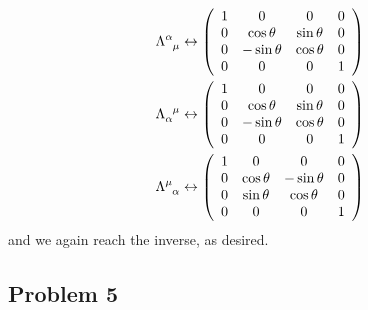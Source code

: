 \documentclass{mathnotes}
\begin{document}
\begin{align*}
    \tensor{\Lambda}{^\alpha_\mu}\leftrightarrow\left(\begin{array}{cccc}
        1 & 0 & 0 & 0\\
        0 & \cos\theta & \sin\theta & 0\\
        0 & -\sin\theta & \cos\theta & 0\\
        0 & 0 & 0 & 1
    \end{array}\right)\\
    \tensor{\Lambda}{_\alpha^\mu}\leftrightarrow\left(\begin{array}{cccc}
        1 & 0 & 0 & 0\\
        0 & \cos\theta & \sin\theta & 0\\
        0 & -\sin\theta & \cos\theta & 0\\
        0 & 0 & 0 & 1
    \end{array}\right)\\
    \tensor{\Lambda}{^\mu_\alpha}\leftrightarrow\left(\begin{array}{cccc}
        1 & 0 & 0 & 0\\
        0 & \cos\theta & -\sin\theta & 0\\
        0 & \sin\theta & \cos\theta & 0\\
        0 & 0 & 0 & 1
    \end{array}\right)
\end{align*}
and we again reach the inverse, as desired.


\subsection*{Problem 5}
\end{document}
